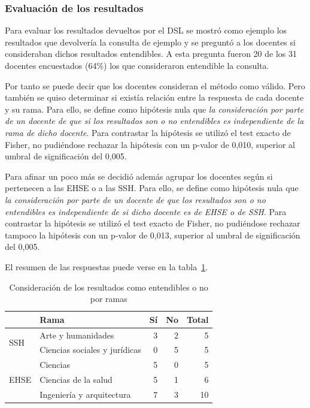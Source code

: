 \subsubsection{Evaluación de los resultados}

Para evaluar los resultados devueltos por el DSL se mostró como ejemplo los resultados que devolvería la consulta de ejemplo y se preguntó a los docentes si consideraban dichos resultados entendibles. A esta pregunta fueron 20 de los 31 docentes encuestados (64\%) los que consideraron entendible la consulta.

Por tanto se puede decir que los docentes consideran el método como válido. Pero también se quiso determinar si existía relación entre la respuesta de cada docente y su rama. Para ello, se define como hipótesis nula que \emph{la consideración por parte de un docente de que si los resultados son o no entendibles es independiente de la rama de dicho docente}. Para contrastar la hipótesis se utilizó el test exacto de Fisher, no pudiéndose rechazar la hipótesis con un p-valor de 0,010, superior al umbral de significación del 0,005.

Para afinar un poco más se decidió además agrupar los docentes según si pertenecen a las EHSE o a  las SSH. Para ello, se define como hipótesis nula que \emph{la consideración por parte de un docente de que los resultados son o no entendibles es independiente de si dicho docente es de EHSE o de SSH}. Para contrastar la hipótesis se utilizó el test exacto de Fisher, no pudiéndose rechazar tampoco la hipótesis con un p-valor de 0,013, superior al umbral de significación del 0,005.

El resumen de las respuestas puede verse en la tabla~\ref{tab:cap:encuesta:resultados:rama}.

\begin{table}
  \begin{center}
  \begin{tabular}{| l | l | r | r | r |}
    \hline
    & Rama & Sí & No & Total \\
    \hline
    \hline
    \multirow{2}{2.5cm}{SSH} & Arte y humanidades & 3 & 2 & 5  \\
    \cline{2-5}
    & Ciencias sociales y jurídicas & 0 & 5 & 5  \\
    \hline
    \multirow{3}{2.5cm}{EHSE} & Ciencias & 5 & 0 & 5  \\
    \cline{2-5}
    & Ciencias de la salud & 5 & 1 & 6  \\
    \cline{2-5}
    & Ingeniería y arquitectura & 7 & 3 & 10 \\
    \hline
  \end{tabular}
\end{center}
\caption{Consideración de los resultados como entendibles o no por ramas}
\label{tab:cap:encuesta:resultados:rama}
\end{table}


